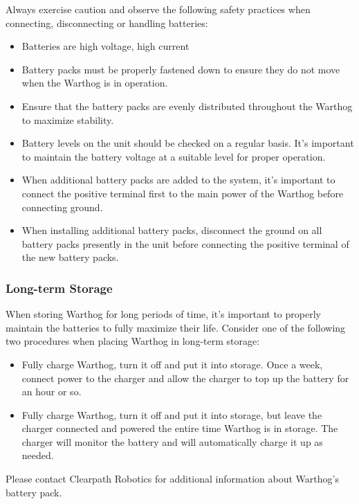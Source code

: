 \documentclass[]{clearpath-latex/clearpath-manual}
\begin{document}
Always exercise caution and observe the following safety practices when connecting, disconnecting or handling batteries:

\begin{itemize}[nolistsep]
  \item Batteries are high voltage, high current
  \item Battery packs must be properly fastened down to ensure they do not move when the Warthog is in operation.
  \item Ensure that the battery packs are evenly distributed throughout the Warthog to maximize stability.
  \item Battery levels on the unit should be checked on a regular basis.  It's important to maintain the battery voltage at a suitable level for proper operation.
  \item When additional battery packs are added to the system, it's important to connect the positive terminal first to the main power of the Warthog before connecting ground.
  \item When installing additional battery packs, disconnect the ground on all battery packs presently in the unit before connecting the positive terminal of the new battery packs.
\end{itemize}

\subsubsection{Long-term Storage}

When storing Warthog for long periods of time, it's important to properly maintain the batteries to fully maximize their life.  Consider one of the following two procedures when placing Warthog in long-term storage:

\begin{itemize}[nolistsep]
  \item Fully charge Warthog, turn it off and put it into storage.  Once a week, connect power to the charger and allow the charger to top up the battery for an hour or so.
  \item Fully charge Warthog, turn it off and put it into storage, but leave the charger connected and powered the entire time Warthog is in storage.  The charger will monitor the battery and will automatically charge it up as needed.
\end{itemize}


Please contact Clearpath Robotics for additional information about Warthog's battery pack.
\end{document}

